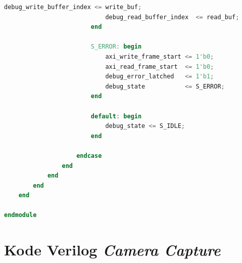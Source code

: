 \begin{lstlisting}[language=Verilog, title={Kode \emph{Base Address Controller} untuk mengatur \emph{double buffer memory}}, label={code:double-biffer-mem}]
                            debug_write_buffer_index <= write_buf;
                            debug_read_buffer_index  <= read_buf;
                        end

                        S_ERROR: begin
                            axi_write_frame_start <= 1'b0;
                            axi_read_frame_start  <= 1'b0;
                            debug_error_latched   <= 1'b1;
                            debug_state           <= S_ERROR;
                        end

                        default: begin
                            debug_state <= S_IDLE;
                        end

                    endcase
                end
            end
        end
    end

endmodule

	\end{lstlisting}

\section{Kode Verilog \emph{Camera Capture}}

